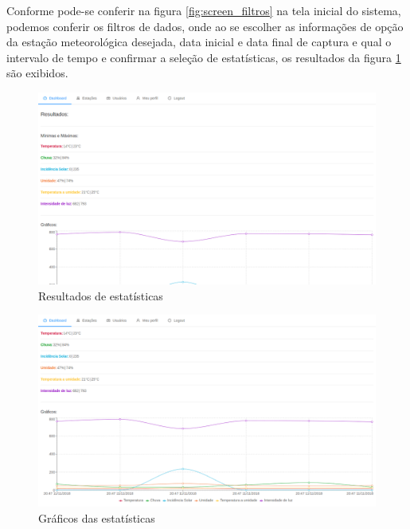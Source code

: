 Conforme pode-se conferir na figura \ref{fig:screen_filtros} na tela inicial do sistema, podemos conferir os filtros de dados, onde ao se escolher as informações de opção da estação meteorológica desejada, data inicial e data final de captura e qual o intervalo de tempo e confirmar a seleção de estatísticas, os resultados da figura \ref{fig:screen_graphs1} são exibidos.

\begin{figure}[H]
    \centering
    \caption{Resultados de estatísticas \label{fig:screen_graphs1}}
    \includegraphics[scale=0.3]{telas/grafico1.png}
    \hfill
{}
\end{figure}

\begin{figure}[H]
    \centering
    \caption{Gráficos das estatísticas \label{fig:screen_graphs2}}
    \includegraphics[scale=0.3]{telas/grafico2.png}
    \hfill
{}
\end{figure}

